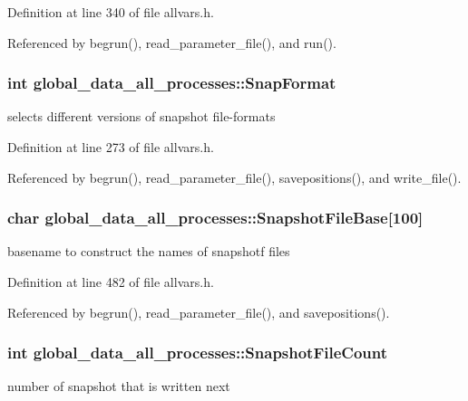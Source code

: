 Definition at line 340 of file allvars.h.



Referenced by begrun(), read\_\-parameter\_\-file(), and run().

\hypertarget{structglobal__data__all__processes_a6e7d07e68bd6242059d1adac6dabf0d1}{
\subsubsection[{SnapFormat}]{\setlength{\rightskip}{0pt plus 5cm}int {\bf global\_\-data\_\-all\_\-processes::SnapFormat}}}
\label{structglobal__data__all__processes_a6e7d07e68bd6242059d1adac6dabf0d1}
selects different versions of snapshot file-\/formats 

Definition at line 273 of file allvars.h.



Referenced by begrun(), read\_\-parameter\_\-file(), savepositions(), and write\_\-file().

\hypertarget{structglobal__data__all__processes_a4bcf5b5c31545691038015af9ae9acb3}{
\subsubsection[{SnapshotFileBase}]{\setlength{\rightskip}{0pt plus 5cm}char {\bf global\_\-data\_\-all\_\-processes::SnapshotFileBase}\mbox{[}100\mbox{]}}}
\label{structglobal__data__all__processes_a4bcf5b5c31545691038015af9ae9acb3}
basename to construct the names of snapshotf files 

Definition at line 482 of file allvars.h.



Referenced by begrun(), read\_\-parameter\_\-file(), and savepositions().

\hypertarget{structglobal__data__all__processes_aac0d3fcbac688a31e6bda55ef819c44b}{
\subsubsection[{SnapshotFileCount}]{\setlength{\rightskip}{0pt plus 5cm}int {\bf global\_\-data\_\-all\_\-processes::SnapshotFileCount}}}
\label{structglobal__data__all__processes_aac0d3fcbac688a31e6bda55ef819c44b}
number of snapshot that is written next 

